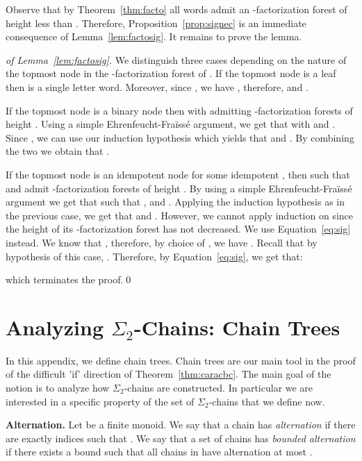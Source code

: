 \documentclass[envcountsame]{llncs}
\newcommand{\efgame}{Ehrenfeucht-Fra\"iss\'e\xspace}
\newcommand{\sic}[1]{\ensuremath{\Sigma_{#1}}\xspace}
\newcommand\chain{chain\xspace}
\newcommand\chains{chains\xspace}
\newcommand\qchains[1]{\ensuremath{\sic{#1}}-chains\xspace}
\newcommand\Chain{Chain\xspace}
\newcommand\qChains[1]{\ensuremath{\sic{#1}}-Chains\xspace}
\newcommand\dchains{\qchains{2}}
\newcommand\dChains{\qChains{2}}
\begin{document}
Observe that by Theorem~\ref{thm:facto} all words admit an
-factorization forest of height less than . Therefore,
Proposition~\ref{prop:signec} is an immediate consequence of
Lemma~\ref{lem:factosig}. It remains to prove the lemma.

\begin{proof}[of Lemma~\ref{lem:factosig}]
  We distinguish three cases depending on the nature of the topmost node
  in the -factorization forest of . If the topmost node is a
  leaf then  is a single letter word. Moreover, since , we have , therefore,  and
  .

  If the topmost node is a binary node then  with
   admitting -factorization forests of height . Using a simple \efgame argument, we get that  with  and . Since ,
  we can use our induction hypothesis which yields that  and . By combining the
  two we obtain that .


  If the topmost node is an idempotent node for some idempotent ,
  then  such that  and  admit -factorization forests of
  height . By using a simple \efgame argument we get
  that  such that ,  and . Applying the induction hypothesis as in
  the previous case, we get that  and
  . However, we cannot apply induction
  on  since the height of its -factorization forest has not
  decreased. We use Equation~\eqref{eq:sig} instead. We know that , therefore, by choice of , we have
  . Recall that by
  hypothesis of this case, . Therefore, by
  Equation~\eqref{eq:sig}, we get that:
  
  \noindent
  which terminates the proof.\qed
\end{proof}

\section{Analyzing \dChains: \Chain Trees}
\label{app:ctrees}
In this appendix, we define \chain trees. \Chain trees are our main
tool in the proof of the difficult 'if' direction of
Theorem~\ref{thm:caracbc}. The main goal of the notion is to analyze
how \dchains are constructed. In particular we are interested in a
specific property of the set of \dchains that we define now.

\medskip
\noindent
{\bf Alternation.} Let  be a finite monoid. We say that a \chain  has \emph{alternation}  if there are exactly 
indices  such that . We say that a set of
\chains  has \emph{bounded alternation} if there exists a bound
 such that all \chains in  have alternation at
most .
\end{document}

